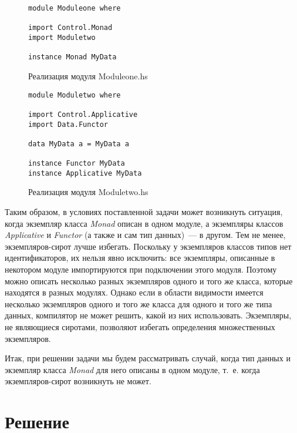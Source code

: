 \begin{figure}[h]
\begin{lstlisting}
module Moduleone where

import Control.Monad
import Moduletwo

instance Monad MyData
\end{lstlisting}
\caption{Реализация модуля Moduleone.hs}\label{one2}
\end{figure}

\begin{figure}[h]
\begin{lstlisting}
module Moduletwo where

import Control.Applicative
import Data.Functor

data MyData a = MyData a

instance Functor MyData
instance Applicative MyData
\end{lstlisting}
\caption{Реализация модуля Moduletwo.hs}\label{two2}
\end{figure}

Таким образом, в условиях поставленной задачи может возникнуть ситуация, когда экземпляр класса \textit{Monad} описан в одном модуле, а экземпляры классов \textit{Applicative} и \textit{Functor} (а также и сам тип данных)~--- в другом. Тем не менее, экземпляров-сирот лучше избегать. Поскольку у экземпляров классов типов нет идентификаторов, их нельзя явно исключить: все экземпляры, описанные в некотором модуле импортируются при подключении этого модуля. Поэтому можно описать несколько разных экземпляров одного и того же класса, которые находятся в разных модулях. Однако если в области видимости имеется несколько экземпляров одного и того же класса для одного и того же типа данных, компилятор не может решить, какой из них использовать. Экземпляры, не являющиеся сиротами, позволяют избегать определения множественных экземпляров.

Итак, при решении задачи мы будем рассматривать случай, когда тип данных и экземпляр класса \textit{Monad} для него описаны в одном модуле, т.~е. когда экземпляров-сирот возникнуть не может.

\newpage
\section{Решение}
